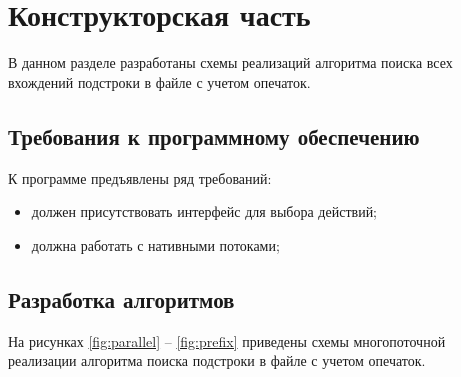 \chapter{Конструкторская часть}

В данном разделе разработаны схемы реализаций алгоритма поиска всех вхождений подстроки в файле с учетом опечаток.

\section{Требования к программному обеспечению}

К программе предъявлены ряд требований:

\begin{itemize}[label=---]
	\item должен присутствовать интерфейс для выбора действий;
	\item должна работать с нативными потоками;
\end{itemize}

\section{Разработка алгоритмов}

На рисунках \ref{fig:parallel} -- \ref{fig:prefix} приведены схемы многопоточной реализации алгоритма поиска подстроки в файле с учетом опечаток.

